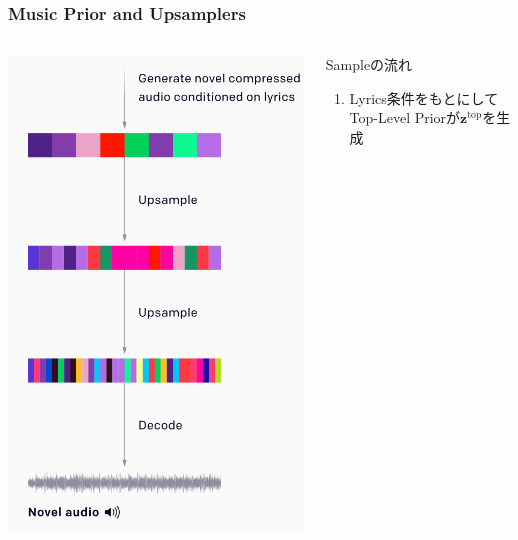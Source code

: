 \documentclass[dvipdfmx]{beamer}
\begin{document}
\begin{frame}
    \frametitle{Music Prior and Upsamplers}
    \begin{columns}
        \begin{column}[T]{0.50\textwidth}
            \centering
            \includegraphics[scale=0.5]{figure/upsampleflow.png}
        \end{column}
        \begin{column}[T]{0.50\textwidth}
            Sampleの流れ
            \begin{enumerate}
                \item Lyrics条件をもとにしてTop-Level Priorが$\bm{z}^{\mathrm{top}}$を生成

\end{enumerate}
\end{column}
\end{columns}
\end{frame}
\end{document}
